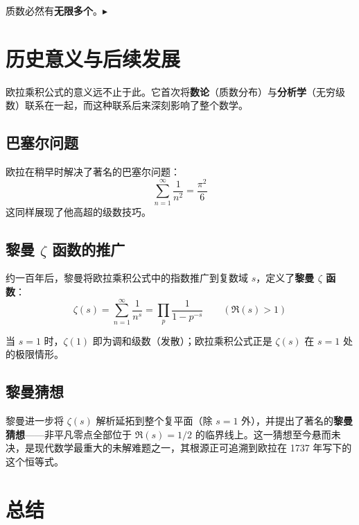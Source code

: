 \documentclass[11pt,a4paper]{ctexart}
\newcommand{\highlight}[1]{\colorbox{accent!20}{\sffamily\bfseries #1}}
\begin{document}
质数必然有\highlight{无限多个}。$\blacktriangleright$

\newpage

\section{历史意义与后续发展}

欧拉乘积公式的意义远不止于此。它首次将\highlight{数论}（质数分布）与\highlight{分析学}（无穷级数）联系在一起，而这种联系后来深刻影响了整个数学。

\subsection*{巴塞尔问题}

欧拉在稍早时解决了著名的巴塞尔问题：
\[
  \sum_{n=1}^{\infty} \frac{1}{n^2} = \frac{\pi^2}{6}
\]
这同样展现了他高超的级数技巧。

\subsection*{黎曼 $\zeta$ 函数的推广}

约一百年后，黎曼将欧拉乘积公式中的指数推广到复数域 $s$，定义了\highlight{黎曼 $\zeta$ 函数}：
\[
  \zeta(s) = \sum_{n=1}^{\infty} \frac{1}{n^s} = \prod_{p} \frac{1}{1 - p^{-s}} \qquad (\Re(s) > 1)
\]

当 $s=1$ 时，$\zeta(1)$ 即为调和级数（发散）；欧拉乘积公式正是 $\zeta(s)$ 在 $s=1$ 处的极限情形。

\subsection*{黎曼猜想}

黎曼进一步将 $\zeta(s)$ 解析延拓到整个复平面（除 $s=1$ 外），并提出了著名的\highlight{黎曼猜想}——非平凡零点全部位于 $\Re(s) = 1/2$ 的临界线上。这一猜想至今悬而未决，是现代数学最重大的未解难题之一，其根源正可追溯到欧拉在 1737 年写下的这个恒等式。

\section{总结}
\end{document}
